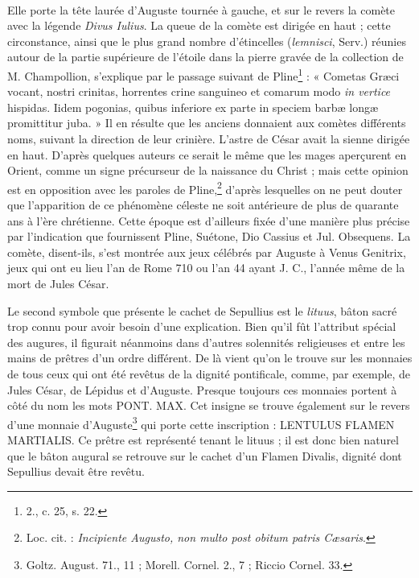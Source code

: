 \documentclass[a4paper, 11pt, oneside, polutonikogreek, french]{article}
\begin{document}
\paragraph{}
Elle porte la tête laurée d'Auguste tournée à gauche, et sur le revers la comète avec la légende \emph{Divus Iulius}. La queue de la comète est dirigée en haut ; cette circonstance, ainsi que le plus grand nombre d'étincelles (\emph{lemnisci}, Serv.) réunies autour de la partie supérieure de l'étoile dans la pierre gravée de la collection de M. Champollion, s'explique par le passage suivant de Pline\footnote{2., c. 25, s. 22.} : « Cometas Græci vocant, nostri crinitas, horrentes crine sanguineo et comarum modo \emph{in vertice} hispidas. Iidem pogonias, quibus inferiore ex parte in speciem barbæ longæ promittitur juba. » Il en résulte que les anciens donnaient aux comètes différents noms, suivant la direction de leur crinière. L'astre de César avait la sienne dirigée en haut. D'après quelques auteurs ce serait le même que les mages aperçurent en Orient, comme un signe précurseur de la naissance du Christ ; mais cette opinion est en opposition avec les paroles de Pline,\footnote{Loc. cit. : \emph{Incipiente Augusto, non multo post obitum patris Cæsaris}.} d'après lesquelles on ne peut douter que l'apparition de ce phénomène céleste ne soit antérieure de plus de quarante ans à l'ère chrétienne. Cette époque est d'ailleurs fixée d'une manière plus précise par l'indication que fournissent Pline, Suétone, Dio Cassius et Jul. Obsequens. La comète, disent-ils, s'est montrée aux jeux célébrés par Auguste à Venus Genitrix, jeux qui ont eu lieu l'an de Rome 710 ou l'an 44 ayant J. C., l'année même de la mort de Jules César.

Le second symbole que présente le cachet de Sepullius est le \emph{lituus}, bâton sacré trop connu pour avoir besoin d'une explication. Bien qu'il fût l'attribut spécial des augures, il figurait néanmoins dans d'autres solennités religieuses et entre les mains de prêtres d'un ordre différent. De là vient qu'on le trouve sur les monnaies de tous ceux qui ont été revêtus de la dignité pontificale, comme, par exemple, de Jules César, de Lépidus et d'Auguste. Presque toujours ces monnaies portent à côté du nom les mots PONT. MAX. Cet insigne se trouve également sur le revers d'une monnaie d'Auguste\footnote{Goltz. August. 71., 11 ; Morell. Cornel. 2., 7 ; Riccio Cornel. 33.} qui porte cette inscription : LENTULUS FLAMEN MARTIALIS. Ce prêtre est représenté tenant le lituus ; il est donc bien naturel que le bâton augural se retrouve sur le cachet d'un Flamen Divalis, dignité dont Sepullius devait être revêtu.
\end{document}
